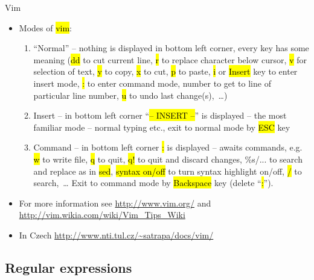 \documentclass[compress, ucs, xelatex, 11pt, xcolor=svgnames,
  hyperref={
    bookmarks=true,
    unicode=true,
    colorlinks=true,
    pdftitle={Linux, command line and MetaCentrum},
    plainpages=false,
    pdfauthor={Vojtech Zeisek},
    pdfsubject={Course about use of Linux command line, writing shell scripts and using MetaCentrum of CESNET},
    pdfcreator={XeLaTeX},
    pdfkeywords={Linux, GNU, BASH, shell, command line, MetaCentrum},
    linkcolor=DarkRed,
    anchorcolor=DarkBlue,
    citecolor=Indigo,
    filecolor=NavyBlue,
    menucolor=DarkMagenta,
    urlcolor=DarkBlue,
    pdftex},
  url={hyphens, lowtilde} %
  ]{beamer}
\renewcommand{\texttt}[1]{\hl{\ttfamily #1}}
\begin{document}
\begin{frame}{Vim}
\begin{itemize}
 \item Modes of \texttt{vim}:
  \begin{enumerate}
   \item ``Normal'' -- nothing is displayed in bottom left corner, every key has some meaning (\texttt{dd} to cut current line, \texttt{r} to replace character below cursor, \texttt{v} for selection of text, \texttt{y} to copy, \texttt{x} to cut, \texttt{p} to paste, \texttt{i} or \texttt{Insert} key to enter insert mode, \texttt{:} to enter command mode, number to get to line of particular line number, \texttt{u} to undo last change(s),~\ldots)
   \item Insert -- in bottom left corner ``\texttt{-- INSERT --}'' is displayed -- the most familiar mode -- normal typing etc., exit to normal mode by \texttt{ESC} key
   \item Command -- in bottom left corner \texttt{:} is displayed -- awaits commands, e.g. \texttt{w} to write file, \texttt{q} to quit, \texttt{q!} to quit and discard changes, \%s/... to search and replace as in \texttt{sed}, \texttt{syntax on/off} to turn syntax highlight on/off, \texttt{/} to search,~\ldots{ }Exit to command mode by \texttt{Backspace} key (delete ``\texttt{:}'').
  \end{enumerate}
  \item For more information see \url{http://www.vim.org/} and \url{http://vim.wikia.com/wiki/Vim_Tips_Wiki}
  \item In Czech \url{http://www.nti.tul.cz/~satrapa/docs/vim/}
\end{itemize}
\end{frame}

\subsection{Regular expressions}
\end{document}
